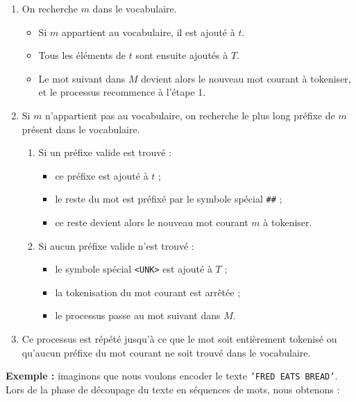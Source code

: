 \documentclass[12pt,a4paper]{report}
\begin{document}
	\begin{enumerate}
		\item On recherche $m$ dans le vocabulaire.
		
			\begin{itemize}
				\item Si $m$ appartient au vocabulaire, il est ajouté à $t$.
				\item Tous les éléments de $t$ sont ensuite ajoutés à $T$.
				\item Le mot suivant dans $M$ devient alors le nouveau mot courant à tokeniser, et le processus recommence à l’étape 1.
			\end{itemize}
			
		\item Si $m$ n’appartient pas au vocabulaire, on recherche le plus long préfixe de $m$ présent dans le vocabulaire.
		
		\begin{enumerate}
			
			\item Si un préfixe valide est trouvé :
			
				\begin{itemize}
					\item ce préfixe est ajouté à $t$ ;
					\item le reste du mot est préfixé par le symbole spécial \texttt{\#\#} ;
					\item ce reste devient alors le nouveau mot courant $m$ à tokeniser.
				\end{itemize}
			\item Si aucun préfixe valide n’est trouvé :
			
				\begin{itemize}
					\item le symbole spécial \texttt{<UNK>} est ajouté à $T$ ;
					\item la tokenisation du mot courant est arrêtée ;
					\item le processus passe au mot suivant dans $M$.
				\end{itemize}
		\end{enumerate}
		\item Ce processus est répété jusqu’à ce que le mot soit entièrement tokenisé ou qu’aucun préfixe du mot courant ne soit trouvé dans le vocabulaire.
	\end{enumerate}
	
	\textbf{Exemple :} imaginons que nous voulons encoder le texte \texttt{'FRED EATS BREAD'}. Lors de la phase de découpage du texte en séquences de mots, nous obtenons :
	
\end{document}
